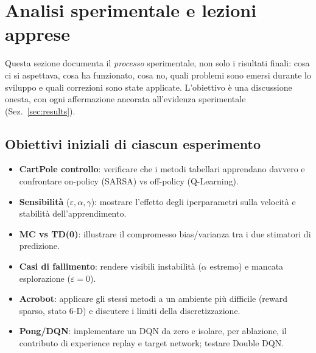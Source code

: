 \section{Analisi sperimentale e lezioni apprese}
\label{sec:lessons}

Questa sezione documenta il \emph{processo} sperimentale, non solo i risultati
finali: cosa ci si aspettava, cosa ha funzionato, cosa no, quali problemi sono
emersi durante lo sviluppo e quali correzioni sono state applicate. L'obiettivo
\`e una discussione onesta, con ogni affermazione ancorata all'evidenza
sperimentale (Sez.~\ref{sec:results}).

\subsection{Obiettivi iniziali di ciascun esperimento}
\begin{itemize}[nosep]
  \item \textbf{CartPole controllo}: verificare che i metodi tabellari
        apprendano davvero e confrontare on-policy (SARSA) vs off-policy
        (Q\hbox{-}Learning).
  \item \textbf{Sensibilit\`a} ($\varepsilon,\alpha,\gamma$): mostrare l'effetto
        degli iperparametri sulla velocit\`a e stabilit\`a dell'apprendimento.
  \item \textbf{MC vs TD(0)}: illustrare il compromesso bias/varianza tra i due
        stimatori di predizione.
  \item \textbf{Casi di fallimento}: rendere visibili instabilit\`a
        ($\alpha$ estremo) e mancata esplorazione ($\varepsilon=0$).
  \item \textbf{Acrobot}: applicare gli stessi metodi a un ambiente pi\`u
        difficile (reward sparso, stato 6-D) e discutere i limiti della
        discretizzazione.
  \item \textbf{Pong/DQN}: implementare un DQN da zero e isolare, per ablazione,
        il contributo di experience replay e target network; testare Double DQN.
\end{itemize}

